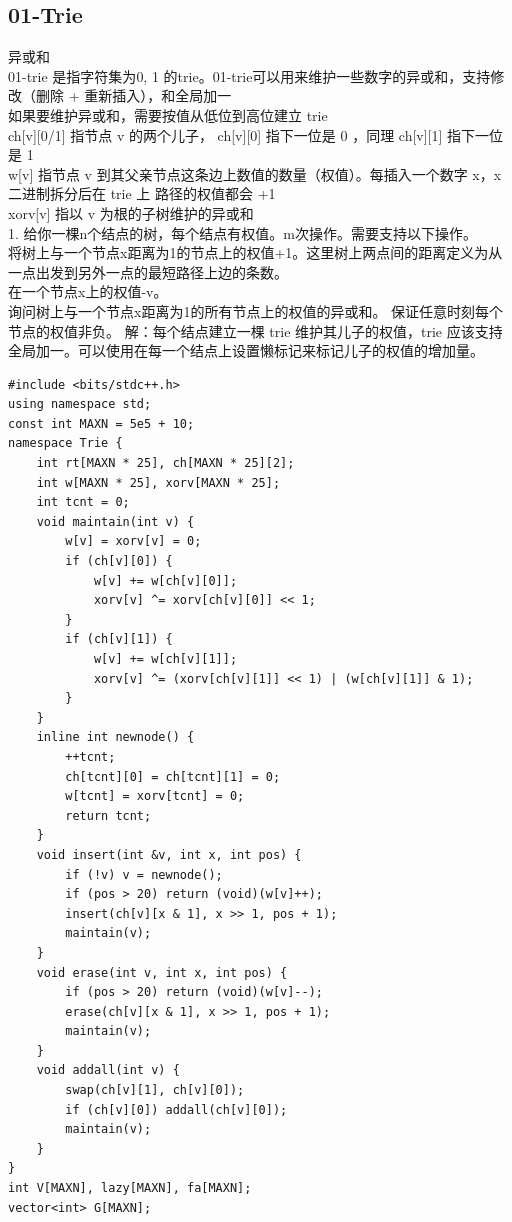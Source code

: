 \documentclass[10pt]{ctexart}
\begin{document}
{\subsection{01-Trie}
异或和\\
01-trie 是指字符集为{0, 1} 的trie。01-trie可以用来维护一些数字的异或和，支持修改（删除 + 重新插入），和全局加一\\
如果要维护异或和，需要按值从低位到高位建立 trie\\
ch[v][0/1] 指节点 v 的两个儿子， ch[v][0] 指下一位是 0 ，同理 ch[v][1] 指下一位是 1\\
w[v] 指节点 v 到其父亲节点这条边上数值的数量（权值）。每插入一个数字 x，x二进制拆分后在 trie 上 路径的权值都会 +1\\
xorv[v] 指以 v 为根的子树维护的异或和\\
1. 给你一棵n个结点的树，每个结点有权值。m次操作。需要支持以下操作。\\
将树上与一个节点x距离为1的节点上的权值+1。这里树上两点间的距离定义为从一点出发到另外一点的最短路径上边的条数。\\
在一个节点x上的权值-v。\\
询问树上与一个节点x距离为1的所有节点上的权值的异或和。 保证任意时刻每个节点的权值非负。
解：每个结点建立一棵 trie 维护其儿子的权值，trie 应该支持全局加一。可以使用在每一个结点上设置懒标记来标记儿子的权值的增加量。
\begin{lstlisting}
#include <bits/stdc++.h>
using namespace std;
const int MAXN = 5e5 + 10;
namespace Trie {
    int rt[MAXN * 25], ch[MAXN * 25][2];
    int w[MAXN * 25], xorv[MAXN * 25];
    int tcnt = 0;
    void maintain(int v) {
        w[v] = xorv[v] = 0;
        if (ch[v][0]) {
            w[v] += w[ch[v][0]];
            xorv[v] ^= xorv[ch[v][0]] << 1;
        }
        if (ch[v][1]) {
            w[v] += w[ch[v][1]];
            xorv[v] ^= (xorv[ch[v][1]] << 1) | (w[ch[v][1]] & 1);
        }
    }
    inline int newnode() {
        ++tcnt;
        ch[tcnt][0] = ch[tcnt][1] = 0;
        w[tcnt] = xorv[tcnt] = 0;
        return tcnt;
    }
    void insert(int &v, int x, int pos) {
        if (!v) v = newnode();
        if (pos > 20) return (void)(w[v]++);
        insert(ch[v][x & 1], x >> 1, pos + 1);
        maintain(v);
    }
    void erase(int v, int x, int pos) {
        if (pos > 20) return (void)(w[v]--);
        erase(ch[v][x & 1], x >> 1, pos + 1);
        maintain(v);
    }
    void addall(int v) {
        swap(ch[v][1], ch[v][0]);
        if (ch[v][0]) addall(ch[v][0]);
        maintain(v);
    }
}
int V[MAXN], lazy[MAXN], fa[MAXN];
vector<int> G[MAXN];

\end{lstlisting}}
\end{document}
